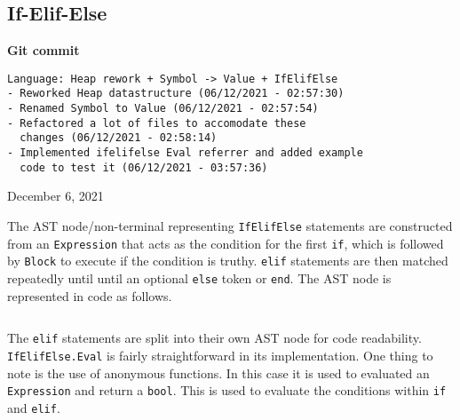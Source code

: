 \subsection{If-Elif-Else}

\begin{center}
    \textbf{Git commit}
    \begin{verbatim}
Language: Heap rework + Symbol -> Value + IfElifElse
- Reworked Heap datastructure (06/12/2021 - 02:57:30)
- Renamed Symbol to Value (06/12/2021 - 02:57:54)
- Refactored a lot of files to accomodate these 
  changes (06/12/2021 - 02:58:14)
- Implemented ifelifelse Eval referrer and added example
  code to test it (06/12/2021 - 03:57:36)
    \end{verbatim}
    \vspace{-1em}
    \tiny{December 6, 2021}
\end{center}

The AST node/non-terminal representing \verb|IfElifElse| statements are constructed from an \verb|Expression| that acts as the condition for the first \verb|if|, which is followed by \verb|Block| to execute if the condition is truthy. \verb|elif| statements are then matched repeatedly until until an optional \verb|else| token or \verb|end|. The AST node is represented in code as follows.

\inputminted[firstline=304, lastline=320, autogobble, breaklines, tabsize=4]{go}{../../src/parser/ast.go}

The \verb|elif| statements are split into their own AST node for code readability. \verb|IfElifElse.Eval| is fairly straightforward in its implementation. One thing to note is the use of anonymous functions. In this case it is used to evaluated an \verb|Expression| and return a \texttt{bool}. This is used to evaluate the conditions within \verb|if| and \verb|elif|.

\inputminted[firstline=764, lastline=778, autogobble, breaklines, tabsize=4]{go}{../../src/parser/eval.go}
